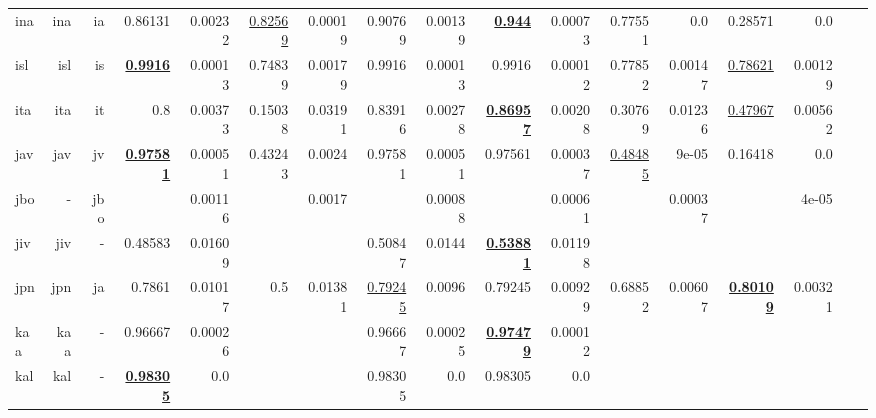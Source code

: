 \documentclass[11pt]{article}
\begin{document}
\begin{table*}[h]
{\begin{tabular}{lrrrrrrrrrrrrrrrr}
ina         & ina         & ia         & 0.86131         & 0.00232         & \underline{0.82569}         & 0.00019         & 0.90769         & 0.00139         & \textbf{\underline{0.944}}         & 0.00073         & 0.77551         & 0.0         & 0.28571         & 0.0         \\
isl         & isl         & is         & \textbf{\underline{0.9916}}         & 0.00013         & 0.74839         & 0.00179         & 0.9916         & 0.00013         & 0.9916         & 0.00012         & 0.77852         & 0.00147         & \underline{0.78621}         & 0.00129         \\
ita         & ita         & it         & 0.8         & 0.00373         & 0.15038         & 0.03191         & 0.83916         & 0.00278         & \textbf{\underline{0.86957}}         & 0.00208         & 0.30769         & 0.01236         & \underline{0.47967}         & 0.00562         \\
jav         & jav         & jv         & \textbf{\underline{0.97581}}         & 0.00051         & 0.43243         & 0.0024         & 0.97581         & 0.00051         & 0.97561         & 0.00037         & \underline{0.48485}         & 9e-05         & 0.16418         & 0.0         \\
jbo         & -         & jbo         &          & 0.00116         &          & 0.0017         &          & 0.00088         &          & 0.00061         &          & 0.00037         &          & 4e-05         \\
jiv         & jiv         & -         & 0.48583         & 0.01609         &          &          & 0.50847         & 0.0144         & \textbf{\underline{0.53881}}         & 0.01198         &          &          &          &          \\
jpn         & jpn         & ja         & 0.7861         & 0.01017         & 0.5         & 0.01381         & \underline{0.79245}         & 0.0096         & 0.79245         & 0.00929         & 0.68852         & 0.00607         & \textbf{\underline{0.80109}}         & 0.00321         \\
kaa         & kaa         & -         & 0.96667         & 0.00026         &          &          & 0.96667         & 0.00025         & \textbf{\underline{0.97479}}         & 0.00012         &          &          &          &          \\
kal         & kal         & -         & \textbf{\underline{0.98305}}         & 0.0         &          &          & 0.98305         & 0.0         & 0.98305         & 0.0         &          &          &          &          \\

\end{tabular}}
\end{table*}
\end{document}
